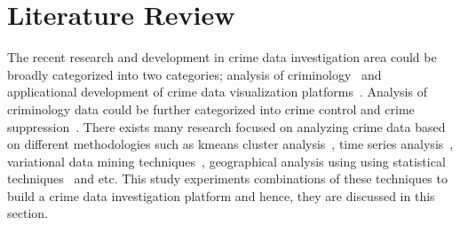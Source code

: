 \section{Literature Review}
The recent research and development in crime data investigation area
could be broadly categorized into two categories; analysis of
criminology~\cite{hid-sp18-409-agarwal2013crime,
hid-sp18-409-bharathi2014survey, hid-sp18-409-kiani2015analysis,
hid-sp18-409-nath2006crime, hid-sp18-409-gera2014city} and
applicational development of crime data visualization
platforms~\cite{hid-sp18-409-www-spotcrime,
hid-sp18-409-www-crimereports, hid-sp18-409-www-mylocalcrime,
hid-sp18-409-www-crimemapping}. Analysis of criminology data could be
further categorized into crime control and crime
suppression~\cite{hid-sp18-409-agarwal2013crime}. There exists many
research focused on analyzing crime data based on different
methodologies such as kmeans cluster
analysis~\cite{hid-sp18-409-gera2014city, hid-sp18-409-nath2006crime,
hid-sp18-409-agarwal2013crime}, time series
analysis~\cite{hid-sp18-409-wei2006time}, variational data mining
techniques~\cite{hid-sp18-409-chen2004crime}, geographical analysis
using using statistical techniques~\cite{hid-sp18-409-santos2016crime}
and etc. This study experiments combinations of these techniques to
build a crime data investigation platform and hence, they are
discussed in this section.

